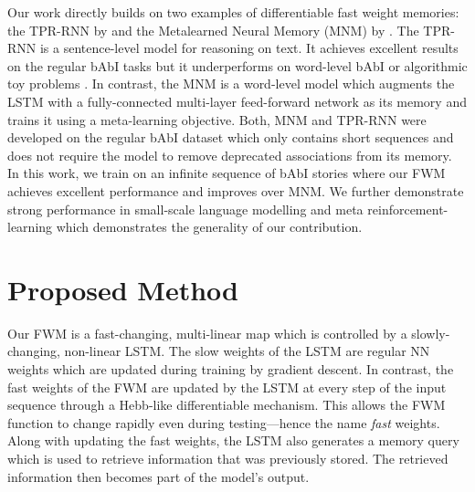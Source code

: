 \documentclass{article} \usepackage{iclr2021_conference,times}
\begin{document}
Our work directly builds on two examples of differentiable fast weight memories: the TPR-RNN by \citet{schlag2018nips} and the Metalearned Neural Memory (MNM) by \citet{munkhdalai2019metalearned}. 
The TPR-RNN is a sentence-level model for reasoning on text. It achieves excellent results on the regular bAbI tasks but it underperforms on word-level bAbI \citep{schlag2019enhancing} or algorithmic toy problems \citep{le2020self}.
In contrast, the MNM is a word-level model which augments the LSTM with a fully-connected multi-layer feed-forward network as its memory and trains it using a meta-learning objective.
Both, MNM and TPR-RNN were developed on the regular bAbI dataset which only contains short sequences and does not require the model to remove deprecated associations from its memory.
In this work, we train on an infinite sequence of bAbI stories where our FWM achieves excellent performance and improves over MNM. 
We further demonstrate strong performance in small-scale language modelling and meta reinforcement-learning which demonstrates the generality of our contribution.

\section{Proposed Method}
\label{sec:method}
Our FWM is a fast-changing, multi-linear map which is controlled by a slowly-changing, non-linear LSTM. 
The slow weights of the LSTM are regular NN weights which are updated during training by gradient descent.
In contrast, the fast weights of the FWM are updated by the LSTM at every step of the input sequence through a Hebb-like differentiable mechanism. 
This allows the FWM function to change rapidly even during testing---hence the name \textit{fast} weights. 
Along with updating the fast weights, the LSTM also generates a memory query which is used to retrieve information that was previously stored.
The retrieved information then becomes part of the model's output. 
\end{document}
